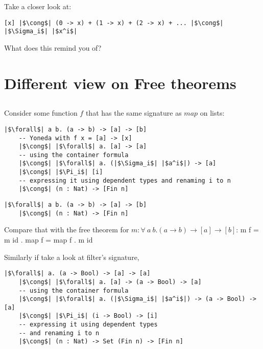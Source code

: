 \documentclass[tikz]{beamer}
\theoremstyle{definition}
\begin{document}
\begin{frame}[fragile]
Take a closer look at:
\begin{verbatim}
[x] |$\cong$| (0 -> x) + (1 -> x) + (2 -> x) + ... |$\cong$| |$\Sigma_i$| |$x^i$|
\end{verbatim}
What does this remind you of?
\end{frame}

\section{Different view on Free theorems}
\subsection{}

\begin{frame}[fragile]
Consider some function $f$ that has the same signature as $map$ on lists:
\begin{verbatim}
|$\forall$| a b. (a -> b) -> [a] -> [b]
    -- Yoneda with f x = [a] -> [x]
    |$\cong$| |$\forall$| a. [a] -> [a]
    -- using the container formula
    |$\cong$| |$\forall$| a. (|$\Sigma_i$| |$a^i$|) -> [a]
    |$\cong$| |$\Pi_i$| [i]
    -- expressing it using dependent types and renaming i to n
    |$\cong$| (n : Nat) -> [Fin n]
\end{verbatim}
\end{frame}

\begin{frame}[fragile]
\begin{verbatim}
|$\forall$| a b. (a -> b) -> [a] -> [b]
    |$\cong$| (n : Nat) -> [Fin n]
\end{verbatim}

Compare that with the free theorem for $m : \forall~a~b. (a \to b) \to [a] \to [b]$:
\newline\newline
m f = m id . map f = map f . m id
\end{frame}

\begin{frame}[fragile]
Similarly if take a look at filter's signature,
\begin{verbatim}
|$\forall$| a. (a -> Bool) -> [a] -> [a]
    |$\cong$| |$\forall$| a. [a] -> (a -> Bool) -> [a]
    -- using the container formula
    |$\cong$| |$\forall$| a. (|$\Sigma_i$| |$a^i$|) -> (a -> Bool) -> [a]
    |$\cong$| |$\Pi_i$| (i -> Bool) -> [i]
    -- expressing it using dependent types
    -- and renaming i to n
    |$\cong$| (n : Nat) -> Set (Fin n) -> [Fin n]
\end{verbatim}
\end{frame}
\end{document}

